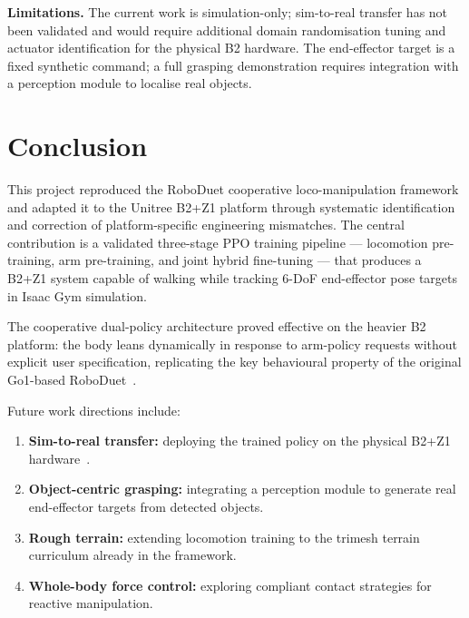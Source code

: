 \textbf{Limitations.}
The current work is simulation-only; sim-to-real transfer has not been
validated and would require additional domain randomisation tuning and
actuator identification for the physical B2 hardware.
The end-effector target is a fixed synthetic command; a full grasping
demonstration requires integration with a perception module to localise
real objects.

\chapter{Conclusion} \label{chp:conclusion}

This project reproduced the RoboDuet cooperative loco-manipulation
framework and adapted it to the Unitree B2+Z1 platform through systematic
identification and correction of platform-specific engineering mismatches.
The central contribution is a validated three-stage PPO training pipeline
--- locomotion pre-training, arm pre-training, and joint hybrid fine-tuning
--- that produces a B2+Z1 system capable of walking while tracking 6-DoF
end-effector pose targets in Isaac Gym simulation.

The cooperative dual-policy architecture proved effective on the heavier B2
platform: the body leans dynamically in response to arm-policy requests
without explicit user specification, replicating the key behavioural
property of the original Go1-based RoboDuet~\cite{pan2024roboduet}.

Future work directions include:
\begin{enumerate}
  \item \textbf{Sim-to-real transfer:} deploying the trained policy on
        the physical B2+Z1 hardware~\cite{lee2020learning,kumar2021rma}.
  \item \textbf{Object-centric grasping:} integrating a perception module
        to generate real end-effector targets from detected objects.
  \item \textbf{Rough terrain:} extending locomotion training to the
        trimesh terrain curriculum already in the framework.
  \item \textbf{Whole-body force control:} exploring compliant contact
        strategies for reactive manipulation.
\end{enumerate}
